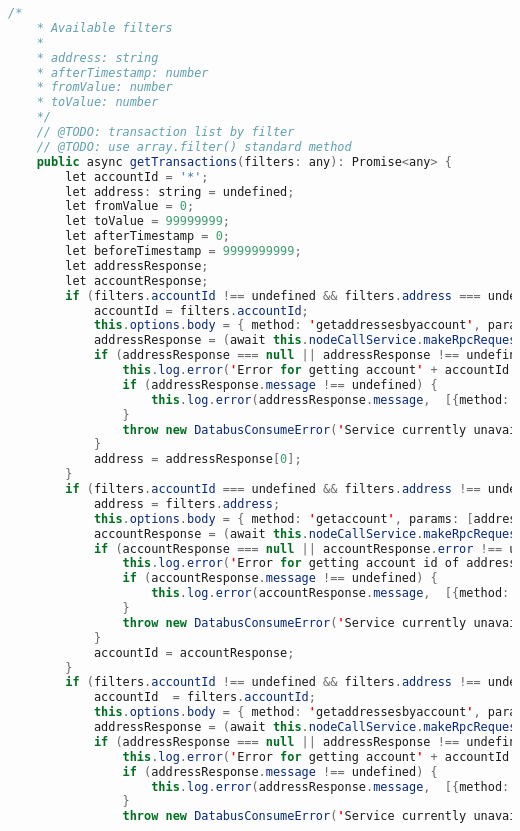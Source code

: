 \begin{lstlisting}[language=java]
	/*
	* Available filters
	*
	* address: string
	* afterTimestamp: number
	* fromValue: number
	* toValue: number
	*/
	// @TODO: transaction list by filter
	// @TODO: use array.filter() standard method
	public async getTransactions(filters: any): Promise<any> {
		let accountId = '*';
		let address: string = undefined;
		let fromValue = 0;
		let toValue = 99999999;
		let afterTimestamp = 0;
		let beforeTimestamp = 9999999999;
		let addressResponse;
		let accountResponse;
		if (filters.accountId !== undefined && filters.address === undefined) {
			accountId = filters.accountId;
			this.options.body = { method: 'getaddressesbyaccount', params: [accountId] };
			addressResponse = (await this.nodeCallService.makeRpcRequest(this.options))[0];
			if (addressResponse === null || addressResponse !== undefined && addressResponse.error !== undefined) {
				this.log.error('Error for getting account' + accountId + ' addresses on bitcoin', [{method: 'getTransactions'}]);
				if (addressResponse.message !== undefined) {
					this.log.error(addressResponse.message,  [{method: 'getTransactions'}]);
				}
				throw new DatabusConsumeError('Service currently unavailable');
			}
			address = addressResponse[0];
		}
		if (filters.accountId === undefined && filters.address !== undefined) {
			address = filters.address;
			this.options.body = { method: 'getaccount', params: [address] };
			accountResponse = (await this.nodeCallService.makeRpcRequest(this.options))[0];
			if (accountResponse === null || accountResponse.error !== undefined) {
				this.log.error('Error for getting account id of address ' + address + ' on bitcoin blockchain', [{method: 'getTransactions'}]);
				if (accountResponse.message !== undefined) {
					this.log.error(accountResponse.message,  [{method: 'getTransactions'}]);
				}
				throw new DatabusConsumeError('Service currently unavailable');
			}
			accountId = accountResponse;
		}
		if (filters.accountId !== undefined && filters.address !== undefined) {
			accountId  = filters.accountId;
			this.options.body = { method: 'getaddressesbyaccount', params: [accountId] };
			addressResponse = (await this.nodeCallService.makeRpcRequest(this.options))[0];
			if (addressResponse === null || addressResponse !== undefined && addressResponse.error !== undefined) {
				this.log.error('Error for getting account' + accountId + ' addresses on bitcoin', [{method: 'getTransactions'}]);
				if (addressResponse.message !== undefined) {
					this.log.error(addressResponse.message,  [{method: 'getTransactions'}]);
				}
				throw new DatabusConsumeError('Service currently unavailable');

\end{lstlisting}
